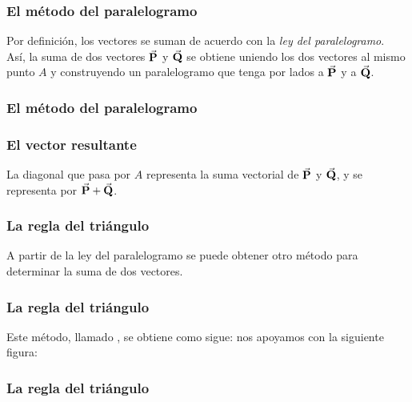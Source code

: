 \documentclass[12pt]{beamer}
\begin{document}
\begin{frame}
\frametitle{El método del paralelogramo}
Por definición, los vectores se suman de acuerdo con la \emph{ley del paralelogramo}.
\\
\bigskip
\pause
Así, la suma de dos vectores $\va{P}$ y $\va{Q}$ se obtiene uniendo los dos vectores al mismo punto $A$ y construyendo un paralelogramo que tenga por lados a $\va{P}$ y a $\va{Q}$.
\end{frame}
\begin{frame}
\frametitle{El método del paralelogramo}
\begin{figure}
    \centering
\end{figure}
\end{frame}
\begin{frame}
\frametitle{El vector resultante}
La diagonal que pasa por $A$ representa la suma vectorial de $\va{P}$ y $\va{Q}$, y se representa por $\va{P} + \va{Q}$.
\end{frame}
\begin{frame}
\frametitle{La regla del triángulo}
A partir de la ley del paralelogramo se puede obtener otro método para determinar
la suma de dos vectores.
\end{frame}
\begin{frame}
\frametitle{La regla del triángulo}    
Este método, llamado , se obtiene como sigue: \pause nos apoyamos con la siguiente figura:
\end{frame}
\begin{frame}
\frametitle{La regla del triángulo}    
\begin{figure}
    \centering
\end{figure}
\end{frame}
\end{document}
